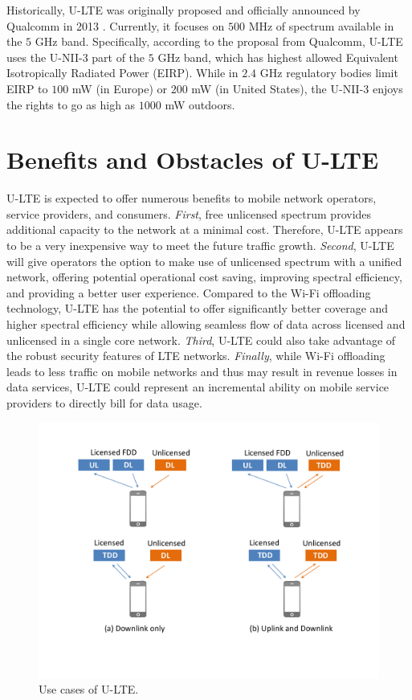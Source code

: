 Historically, U-LTE was originally proposed and officially announced by Qualcomm in 2013 \cite{Qualcomm-U-LTE-2013}. Currently, it focuses on $500$ MHz of spectrum available in the $5$ GHz band. Specifically, according to the proposal from Qualcomm, U-LTE uses the U-NII-3 part of the $5$ GHz band, which has highest allowed Equivalent Isotropically Radiated Power (EIRP). While in $2.4$ GHz regulatory bodies limit EIRP to $100$ mW (in Europe) or $200$ mW (in United States), the U-NII-3 enjoys the rights to go as high as $1000$ mW outdoors.

\section{Benefits and Obstacles of U-LTE}
\label{lte-ben}

U-LTE is expected to offer numerous benefits to mobile network operators, service providers, and consumers. \textit{First}, free unlicensed spectrum provides additional capacity to the network at a minimal cost. Therefore, U-LTE appears to be a very inexpensive way to meet the future traffic growth. \textit{Second}, U-LTE will give operators the option to make use of unlicensed spectrum with a unified network, offering potential operational cost saving, improving spectral efficiency, and providing a better user experience. Compared to the Wi-Fi offloading technology, U-LTE has the potential to offer significantly better coverage and higher spectral efficiency while allowing seamless flow of data across licensed and unlicensed in a single core network. \textit{Third}, U-LTE could also take advantage of the robust security features of LTE networks. \textit{Finally}, while Wi-Fi offloading leads to less traffic on mobile networks and thus may result in revenue losses in data services, U-LTE could represent an incremental ability on mobile service providers to directly bill for data usage.

\begin{figure}[!t]
	\centering
	\includegraphics[width=0.7\columnwidth]{figures2/U-LTE-use_model}
	\caption{Use cases of U-LTE.}
	\label{figs:U-LTE-use_model}
\end{figure}

